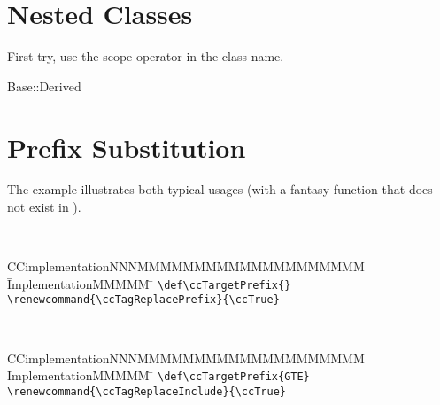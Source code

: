 \documentclass[12pt]{article}
\begin{document}
{{%
\section{Nested Classes}

First try, use the scope operator in the class name.

\begin{ccClass}{Base::Derived}

\end{ccClass}

\section{Prefix Substitution}

The example illustrates both typical usages (with a fantasy function
that does not exist in \cgal).


\\
\vspace{-\parskip}

\begin{tabbing}
  CCimplementationNNNMMMMMMMMMMMMMMMMMMMM \= ImplementationMMMMM \= \kill
  \verb+\def\ccTargetPrefix{}+ \\
  \verb+\renewcommand{\ccTagReplacePrefix}{\ccTrue}+
\end{tabbing}
\def\ccTargetPrefix{}
\renewcommand{\ccTagReplacePrefix}{\ccTrue}
\vspace{-\parskip}

\\
\vspace{-\parskip}

\begin{tabbing}
  CCimplementationNNNMMMMMMMMMMMMMMMMMMMM \= ImplementationMMMMM \= \kill
  \verb+\def\ccTargetPrefix{GTE}+ \\
  \verb+\renewcommand{\ccTagReplaceInclude}{\ccTrue}+
\end{tabbing}
\def\ccTargetPrefix{GTE}
\renewcommand{\ccTagReplaceInclude}{\ccTrue}
\vspace{-\parskip}

}}
\end{document}

